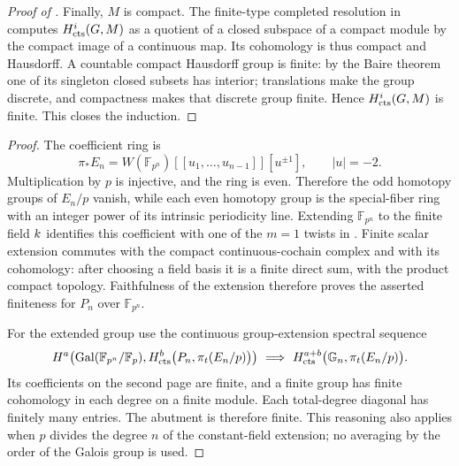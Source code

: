 \begin{proof}[Proof of ]
Finally, $M$ is compact.  The finite-type completed resolution in
 computes $H^i_{\mathrm{cts}}(G,M)$ as a quotient of a
closed subspace of a compact module by the compact image of a continuous
map.  Its cohomology is thus compact and Hausdorff.  A countable compact
Hausdorff group is finite: by the Baire theorem one of its singleton
closed subsets has interior; translations make the group discrete, and
compactness makes that discrete group finite.  Hence
$H^i_{\mathrm{cts}}(G,M)$ is finite.  This closes the induction.
\end{proof}


\begin{proof}
The coefficient ring is
\[
 \pi_*E_n=W(\mathbb F_{p^n})[[u_1,\ldots,u_{n-1}]][u^{\pm1}],
 \qquad |u|=-2.
\]
Multiplication by $p$ is injective, and the ring is even.  Therefore the
odd homotopy groups of $E_n/p$ vanish, while each even homotopy group is
the special-fiber ring with an integer power of its intrinsic periodicity
line.  Extending $\mathbb F_{p^n}$ to the finite field $k$ identifies
this coefficient with one of the $m=1$ twists in
.  Finite scalar extension commutes with the compact
continuous-cochain complex and with its cohomology: after choosing a
field basis it is a finite direct sum, with the product compact topology.
Faithfulness of the extension therefore proves the asserted finiteness
for $P_n$ over $\mathbb F_{p^n}$.

For the extended group use the continuous group-extension spectral
sequence
\[
 H^a\!\left(\operatorname{Gal}(\mathbb F_{p^n}/\mathbb F_p),
       H^b_{\mathrm{cts}}\bigl(P_n,\pi_t(E_n/p)\bigr)\right)
 \ \Longrightarrow\
 H^{a+b}_{\mathrm{cts}}\bigl(\mathbb G_n,\pi_t(E_n/p)\bigr).
\]
Its coefficients on the second page are finite, and a finite group has
finite cohomology in each degree on a finite module.  Each total-degree
diagonal has finitely many entries.  The abutment is therefore finite.
This reasoning also applies when $p$ divides the degree $n$ of the
constant-field extension; no averaging by the order of the Galois group
is used.
\end{proof}
